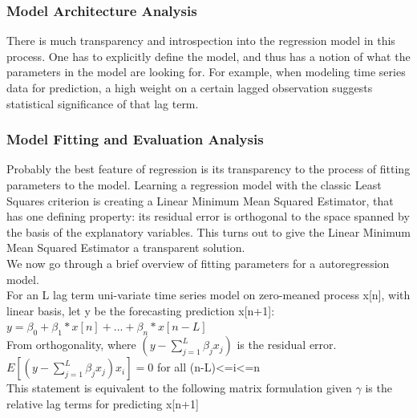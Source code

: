 \documentclass{article}
\begin{document}
\subsubsection{Model Architecture Analysis}
There is much transparency and introspection into the regression model in this process. One has to explicitly define the model, and thus has a notion of what the parameters in the model are looking for. For example, when modeling time series data for prediction, a high weight on a certain lagged observation suggests statistical significance of that lag term. 

\subsubsection{Model Fitting and Evaluation Analysis}
Probably the best feature of regression is its transparency to the process of fitting parameters to the model. Learning a regression model with the classic Least Squares criterion is creating a Linear Minimum Mean Squared Estimator, that has one defining property: its residual error is orthogonal to the space spanned by the basis of the explanatory variables. This turns out to give the Linear Minimum Mean Squared Estimator a transparent solution.\\

\noindent We now go through a brief overview of fitting parameters for a autoregression model.\\

\noindent For an L lag term uni-variate time series model on zero-meaned process x[n], with linear basis, let y be the forecasting prediction x[n+1]:\\

\indent $y = \beta_0 + \beta_1*x[n] +...+ \beta_n*x[n-L]$ \\

\noindent From orthogonality, where $(y- \sum_{j=1}^{L}\beta_jx_j)$ is the residual error.\\

\indent $E[(y- \sum_{j=1}^{L}\beta_jx_j)x_i] = 0$ for all (n-L)<=i<=n\\

\noindent This statement is equivalent to the following matrix formulation given $\gamma$ is the relative lag terms for predicting x[n+1]\\
\end{document}
